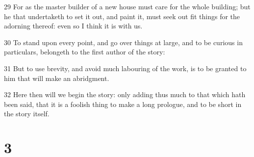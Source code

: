 \par 29 For as the master builder of a new house must care for the whole building; but he that undertaketh to set it out, and paint it, must seek out fit things for the adorning thereof: even so I think it is with us.
\par 30 To stand upon every point, and go over things at large, and to be curious in particulars, belongeth to the first author of the story:
\par 31 But to use brevity, and avoid much labouring of the work, is to be granted to him that will make an abridgment.
\par 32 Here then will we begin the story: only adding thus much to that which hath been said, that it is a foolish thing to make a long prologue, and to be short in the story itself.

\chapter{3}

